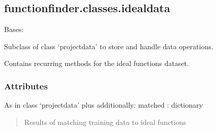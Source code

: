 \documentclass[letterpaper,10pt,english]{sphinxmanual}
\begin{document}
\sphinxstepscope


\subsection{functionfinder.classes.idealdata}
\label{\detokenize{_autosummary/functionfinder.classes.idealdata:functionfinder-classes-idealdata}}\label{\detokenize{_autosummary/functionfinder.classes.idealdata::doc}}

\begin{fulllineitems}
\label{\detokenize{_autosummary/functionfinder.classes.idealdata:functionfinder.classes.idealdata}}
\pysigstartsignatures
{}
\pysigstopsignatures
\sphinxAtStartPar
Bases: {\hyperref[\detokenize{_autosummary/functionfinder.classes.projectdata:functionfinder.classes.projectdata}]{}}

\sphinxAtStartPar
Subclass of class ‘projectdata’ to store and handle data operations.

\sphinxAtStartPar
Contains recurring methods for the ideal functions dataset.


\subsubsection{Attributes}
\label{\detokenize{_autosummary/functionfinder.classes.idealdata:attributes}}
\sphinxAtStartPar
As in class ‘projectdata’ plus additionally:
matched : dictionary
\begin{quote}

\sphinxAtStartPar
Results of matching training data to ideal functions
\end{quote}



\end{fulllineitems}
\end{document}
